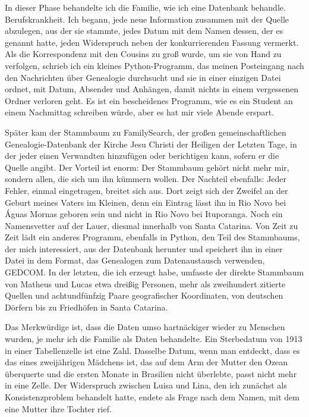 \documentclass[
  ngerman,
  11pt,
  openany]{book}
\begin{document}
In dieser Phase behandelte ich die Familie, wie ich eine Datenbank
behandle. Berufskrankheit. Ich begann, jede neue Information zusammen
mit der Quelle abzulegen, aus der sie stammte, jedes Datum mit dem Namen
dessen, der es genannt hatte, jeden Widerspruch neben der
konkurrierenden Fassung vermerkt. Als die Korrespondenz mit den Cousins
zu groß wurde, um sie von Hand zu verfolgen, schrieb ich ein kleines
Python-Programm, das meinen Posteingang nach den Nachrichten über
Genealogie durchsucht und sie in einer einzigen Datei ordnet, mit Datum,
Absender und Anhängen, damit nichts in einem vergessenen Ordner verloren
geht. Es ist ein bescheidenes Programm, wie es ein Student an einem
Nachmittag schreiben würde, aber es hat mir viele Abende erspart.

Später kam der Stammbaum zu FamilySearch, der großen gemeinschaftlichen
Genealogie-Datenbank der Kirche Jesu Christi der Heiligen der Letzten
Tage, in der jeder einen Verwandten hinzufügen oder berichtigen kann,
sofern er die Quelle angibt. Der Vorteil ist enorm: Der Stammbaum gehört
nicht mehr mir, sondern allen, die sich um ihn kümmern wollen. Der
Nachteil ebenfalls: Jeder Fehler, einmal eingetragen, breitet sich aus.
Dort zeigt sich der Zweifel an der Geburt meines Vaters im Kleinen, denn
ein Eintrag lässt ihn in Rio Novo bei Águas Mornas geboren sein und
nicht in Rio Novo bei Ituporanga. Noch ein Namensvetter auf der Lauer,
diesmal innerhalb von Santa Catarina. Von Zeit zu Zeit lädt ein anderes
Programm, ebenfalls in Python, den Teil des Stammbaums, der mich
interessiert, aus der Datenbank herunter und speichert ihn in einer
Datei in dem Format, das Genealogen zum Datenaustausch verwenden,
GEDCOM. In der letzten, die ich erzeugt habe, umfasste der direkte
Stammbaum von Matheus und Lucas etwa dreißig Personen, mehr als
zweihundert zitierte Quellen und achtundfünfzig Paare geografischer
Koordinaten, von deutschen Dörfern bis zu Friedhöfen in Santa Catarina.

Das Merkwürdige ist, dass die Daten umso hartnäckiger wieder zu Menschen
wurden, je mehr ich die Familie als Daten behandelte. Ein Sterbedatum
von 1913 in einer Tabellenzelle ist eine Zahl. Dasselbe Datum, wenn man
entdeckt, dass es das eines zweijährigen Mädchens ist, das auf dem Arm
der Mutter den Ozean überquerte und die ersten Monate in Brasilien nicht
überlebte, passt nicht mehr in eine Zelle. Der Widerspruch zwischen
Luisa und Lina, den ich zunächst als Konsistenzproblem behandelt hatte,
endete als Frage nach dem Namen, mit dem eine Mutter ihre Tochter rief.
\end{document}
